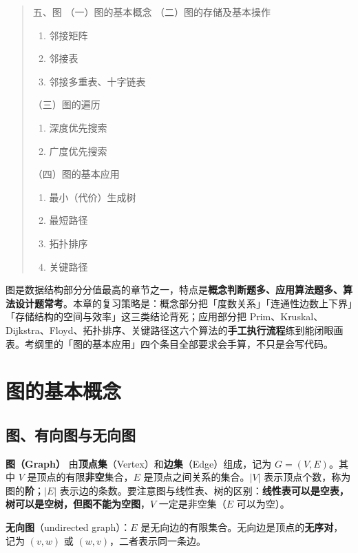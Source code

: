 \documentclass[11pt,openany,UTF8]{ctexbook}
\begin{document}
\begin{quote}
五、图 （一）图的基本概念 （二）图的存储及基本操作

\begin{enumerate}
\item 邻接矩阵
\item 邻接表
\item 邻接多重表、十字链表
\end{enumerate}
（三）图的遍历

\begin{enumerate}
\item 深度优先搜索
\item 广度优先搜索
\end{enumerate}
（四）图的基本应用

\begin{enumerate}
\item 最小（代价）生成树
\item 最短路径
\item 拓扑排序
\item 关键路径
\end{enumerate}
\end{quote}
图是数据结构部分分值最高的章节之一，特点是\textbf{概念判断题多、应用算法题多、算法设计题常考}。本章的复习策略是：概念部分把「度数关系」「连通性边数上下界」「存储结构的空间与效率」这三类结论背死；应用部分把 Prim、Kruskal、Dijkstra、Floyd、拓扑排序、关键路径这六个算法的\textbf{手工执行流程}练到能闭眼画表。考纲里的「图的基本应用」四个条目全部要求会手算，不只是会写代码。

\section{图的基本概念}

\subsection{图、有向图与无向图}

\textbf{图（Graph）} 由\textbf{顶点集}（Vertex）和\textbf{边集}（Edge）组成，记为 $G=(V,E)$。其中 $V$ 是顶点的有限\textbf{非空}集合，$E$ 是顶点之间关系的集合。$|V|$ 表示顶点个数，称为图的\textbf{阶}；$|E|$ 表示边的条数。要注意图与线性表、树的区别：\textbf{线性表可以是空表，树可以是空树，但图不能为空图}，$V$ 一定是非空集（$E$ 可以为空）。

\textbf{无向图}（undirected graph）：$E$ 是无向边的有限集合。无向边是顶点的\textbf{无序对}，记为 $(v,w)$ 或 $(w,v)$，二者表示同一条边。
\end{document}
